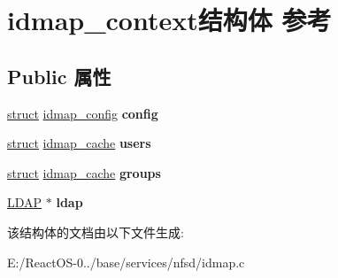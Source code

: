 \hypertarget{structidmap__context}{}\section{idmap\+\_\+context结构体 参考}
\label{structidmap__context}
\subsection*{Public 属性}
\begin{DoxyCompactItemize}
\item 
\mbox{\label{structidmap__context_a9964ab6086dc3282d7f1f4d235314650}} 
\hyperlink{interfacestruct}{struct} \hyperlink{structidmap__config}{idmap\+\_\+config} {\bfseries config}
\item 
\mbox{\label{structidmap__context_a89cd30de1aba052527ff545ed0aa1aeb}} 
\hyperlink{interfacestruct}{struct} \hyperlink{structidmap__cache}{idmap\+\_\+cache} {\bfseries users}
\item 
\mbox{\label{structidmap__context_a8d37c7e42b00ab98cd543a3b3a852af6}} 
\hyperlink{interfacestruct}{struct} \hyperlink{structidmap__cache}{idmap\+\_\+cache} {\bfseries groups}
\item 
\mbox{\label{structidmap__context_a027d56b1ef3206ccd69aa0efcacd35fa}} 
\hyperlink{structldap}{L\+D\+AP} $\ast$ {\bfseries ldap}
\end{DoxyCompactItemize}


该结构体的文档由以下文件生成\+:\begin{DoxyCompactItemize}
\item 
E\+:/\+React\+O\+S-\/0../base/services/nfsd/idmap.\+c\end{DoxyCompactItemize}
